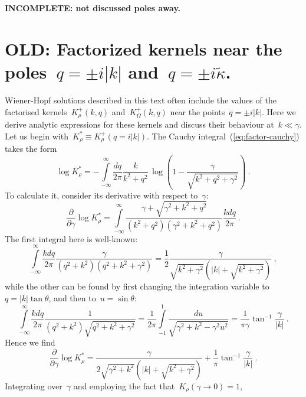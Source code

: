 \documentclass[preprint,aps,eqsecnum, prb]{revtex4-1}
\newcommand{\fplus}[1]{{#1}^{+}}
\begin{document}
\textbf{INCOMPLETE: not discussed poles away.}

\section{OLD: Factorized kernels near the poles~$q = \pm i|k|$ and~$q = \pm i {\tilde \kappa}$.}
\label{sec:appendix-kstar}
Wiener-Hopf solutions described in this text often include the values of the
factorised kernels~$\fplus{K}_\rho(k, q)$ and~$\fplus{K}_\Omega(k, q)$ near
the points~$q = \pm i|k|$. Here we derive analytic expressions for these kernels
and discuss their behaviour at~$k \ll \gamma$. Let us begin
with~$K_\rho^\ast \equiv \fplus{K}_\rho(q = i|k|)$. The Cauchy
integral~(\ref{eq:factor-cauchy}) takes the form
\begin{equation}
  \log K_\rho^\ast = - \int\limits_{-\infty}^{\infty}\frac{dq}{2\pi} \frac{k}{k^2 + q^2}
  \, \log\left(1 - \frac{\gamma}{\sqrt{k^2 + q^2 + \gamma^2}}\right)
  \ .
\end{equation}
To calculate it, consider its derivative with respect to~$\gamma$:
\begin{equation}
  \frac{\partial}{\partial \gamma} \log K_\rho^\ast
  = \int\limits_{-\infty}^{\infty}
  \frac{\gamma + \sqrt{\gamma^2 + k^2 + q^2}}{(k^2 + q^2)(\gamma^2 + k^2 + q^2)}
  \frac{kdq}{2\pi}
  \ .
\end{equation}
The first integral here is well-known:
\begin{equation}
\int\limits_{-\infty}^{\infty} \frac{k dq}{2\pi} \frac{\gamma}{(q^2 + k^2)(q^2 + k^2 + \gamma^2)}
 = \frac{1}{2} \frac{\gamma}{\sqrt{k^2 + \gamma^2}(|k| + \sqrt{k^2 + \gamma^2})}
 \ ,
\end{equation}
while the other can be found by first changing the integration variable
to~$q = |k|\tan\theta$, and then to~$u = \sin\theta$:
\begin{equation}
  \int\limits_{-\infty}^{\infty} \frac{kdq}{2\pi}
  \frac{1}{(q^2 + k^2)\sqrt{q^2 + k^2 + \gamma^2}}
  = \frac{1}{2\pi}\int\limits_{-1}^{1} \frac{du}{\sqrt{\gamma^2 + k^2 - \gamma^2 u^2}}
   = \frac{1}{\pi\gamma} \tan^{-1}\frac{\gamma}{|k|}
  \ .
\end{equation}
Hence we find
\begin{equation}
  \frac{\partial}{\partial \gamma} \log K_\rho^\ast =
  \frac{\gamma}{2\sqrt{\gamma^2 + k^2}(|k| + \sqrt{k^2 + \gamma^2})}
  + \frac{1}{\pi} \tan^{-1}\frac{\gamma}{|k|}
  \ .
\end{equation}
Integrating over~$\gamma$ and employing the fact that~$K_\rho (\gamma \to 0) = 1$,
\end{document}
